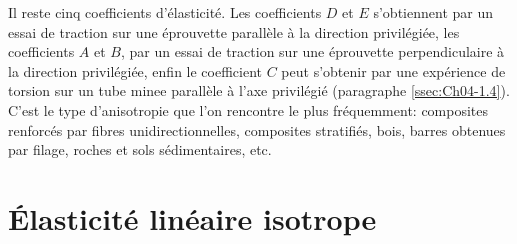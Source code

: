 Il reste cinq coefficients d'élasticité.
Les coefficients $D$ et $E$ s'obtiennent par un essai de traction sur une éprouvette parallèle à la direction privilégiée, les coefficients $A$ et $B$, par un essai de traction sur une éprouvette perpendiculaire à la direction privilégiée, enfin le coefficient $C$ peut s'obtenir par une expérience de torsion sur un tube minee parallèle à l'axe privilégié (paragraphe \ref{ssec:Ch04-1.4}).
C'est le type d'anisotropie que l'on rencontre le plus fréquemment: composites renforcés par fibres unidirectionnelles, composites stratifiés, bois, barres obtenues par filage, roches et sols sédimentaires, etc.

\section{Élasticité linéaire isotrope} \label{sec:Ch05-2}
